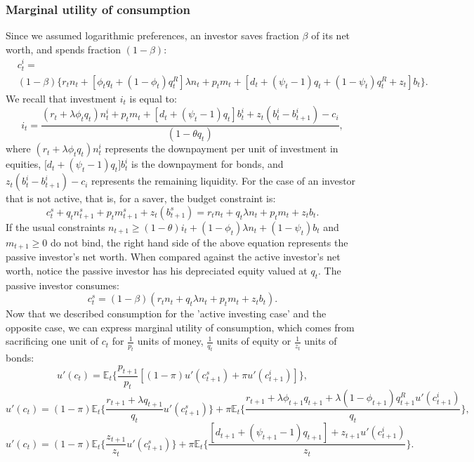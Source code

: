 \documentclass[12pt]{article}%
\begin{document}
\subsubsection{Marginal utility of consumption}
Since we assumed logarithmic preferences, an investor saves fraction $\beta$
of its net worth, and spends fraction $(1-\beta)$:
\begin{equation}
  \begin{split}
 &c^i_t =
\\ &(1-\beta) \Big\{ r_t n_t + [\phi_t q_t + (1-\phi_t)q^R_t]\lambda n_t +p_t
m_t + [d_t+(\psi_t -1)q_t +(1-\psi_t)q^R_t+z_t]b_t \Big\}.
\end{split} 
\end{equation}
We recall that investment $i_t$ is equal to:
\begin{equation}
i_t = \frac{(r_t + \lambda \phi_t q_t)n^i_t + p_t m_t + [d_t + (\psi_t -1)q_t]b^i_t
+z_t (b^i_t -b^i_{t+1})-c_i
}{(1-\theta q_t)},
\end{equation}
where $(r_t + \lambda \phi_t q_t)n^i_t $ represents the downpayment per unit of
investment in equities, [$d_t + (\psi_t -1)q_t]b^i_t$ is the downpayment for
bonds, and $z_t (b^i_t -b^i_{t+1})-c_i$ represents the remaining liquidity. 
For the case of an investor that is not active, that is, for a saver, the budget
constraint is:
\begin{equation}
c^s_t +q_t n^s_{t+1} +p_t m^s_{t+1} +z_t(b^s_{t+1}) =r_t n_t +q_t \lambda n_t +
p_t m_t + z_t b_t.
\end{equation}
If the usual constraints $n_{t+1} \ge (1-\theta)i_t + (1-\phi_t)\lambda n_t
+ (1-\psi_t)b_t$ and $m_{t+1}\ge 0$ do not bind, the right hand side of the
above equation represents the passive investor's net worth. When compared
against the active investor's net worth, notice the passive investor has his
depreciated equity valued at $q_t$. The passive investor consumes:
\begin{equation}
c^s_t = (1-\beta)(r_t n_t + q_t \lambda n_t + p_t m_t + z_t b_t).
\end{equation}
Now that we described consumption for the 'active investing case' and the
opposite case, we can express marginal utility of consumption, which comes from
sacrificing one unit of $c_t$ for $\frac{1}{p_t}$ units of money,
$\frac{1}{q_t}$ units of equity or $\frac{1}{z_t}$ units of bonds:
\begin{equation}
u'(c_t) = \mathbb{E}_t \Big\{ \frac{p_{t+1}}{p_t} [(1-\pi)u'(c^s_{t+1})+\pi u'(c^i_{t+1})]
\Big\},
\end{equation}
\begin{equation}
u'(c_t) = (1-\pi) \mathbb{E}_t \Big\{ \frac{r_{t+1}+\lambda q_{t+1}}{q_t} u'(c^s_{t+1})
\Big\} +\pi \mathbb{E}_t \Big\{ \frac{r_{t+1}+\lambda \phi_{t+1}q_{t+1}+\lambda (1-\phi_{t+1})q^R
_{t+1}u'(c^i_{t+1})}{q_t}\Big\},
\end{equation}
\begin{equation}
u'(c_t) = (1-\pi) \mathbb{E}_t \Big\{ \frac{z_{t+1}}{z_t}u'(c^s_{t+1})
\Big\} +\pi \mathbb{E}_t \Big\{ 
\frac{[d_{t+1}+(\psi_{t+1}-1)q_{t+1}]+z_{t+1} u'(c^i_{t+1})}{z_t}
\Big\}.
\end{equation}
\end{document}

